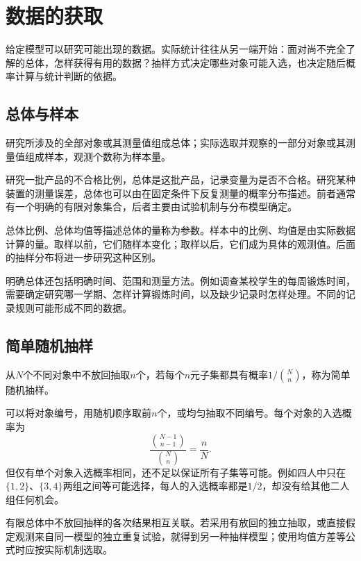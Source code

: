 \FloatBarrier
\newpage
\section{数据的获取}
\label{sec:prob-sampling}

给定模型可以研究可能出现的数据。实际统计往往从另一端开始：面对尚不完全了解的总体，怎样获得有用的数据？抽样方式决定哪些对象可能入选，也决定随后概率计算与统计判断的依据。

\subsection{总体与样本}

\begin{definition}
研究所涉及的全部对象或其测量值组成{\heiti 总体}；实际选取并观察的一部分对象或其测量值组成{\heiti 样本}，观测个数称为{\heiti 样本量}。
\end{definition}

研究一批产品的不合格比例，总体是这批产品，记录变量为是否不合格。研究某种装置的测量误差，总体也可以由在固定条件下反复测量的概率分布描述。前者通常有一个明确的有限对象集合，后者主要由试验机制与分布模型确定。

总体比例、总体均值等描述总体的量称为{\heiti 参数}。样本中的比例、均值是由实际数据计算的量。取样以前，它们随样本变化；取样以后，它们成为具体的观测值。后面的抽样分布将进一步研究这种区别。

明确总体还包括明确时间、范围和测量方法。例如调查某校学生的每周锻炼时间，需要确定研究哪一学期、怎样计算锻炼时间，以及缺少记录时怎样处理。不同的记录规则可能形成不同的数据。

\subsection{简单随机抽样}

\begin{definition}
从\(N\)个不同对象中不放回抽取\(n\)个，若每个\(n\)元子集都具有概率\(1/\binom Nn\)，称为{\heiti 简单随机抽样}。
\end{definition}

可以将对象编号，用随机顺序取前\(n\)个，或均匀抽取不同编号。每个对象的入选概率为
\[
 \frac{\binom{N-1}{n-1}}{\binom Nn}=\frac nN.
\]
但仅有单个对象入选概率相同，还不足以保证所有子集等可能。例如四人中只在\(\{1,2\}\)、\(\{3,4\}\)两组之间等可能选择，每人的入选概率都是\(1/2\)，却没有给其他二人组任何机会。

有限总体中不放回抽样的各次结果相互关联。若采用有放回的独立抽取，或直接假定观测来自同一模型的独立重复试验，就得到另一种抽样模型；使用均值方差等公式时应按实际机制选取。

